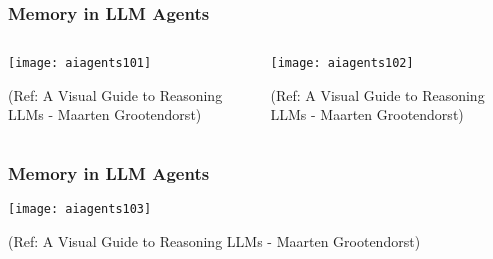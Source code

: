 \begin{frame}[fragile]\frametitle{Memory in LLM Agents}


\begin{columns}
    \begin{column}[T]{0.6\linewidth}
        \begin{center}
        \texttt{[image: aiagents101]}

		
        {\tiny (Ref: A Visual Guide to Reasoning LLMs - Maarten Grootendorst)}
        \end{center}

    \end{column}
    \begin{column}[T]{0.4\linewidth}
        \begin{center}
        \texttt{[image: aiagents102]}

		
        {\tiny (Ref: A Visual Guide to Reasoning LLMs - Maarten Grootendorst)}
        \end{center}
    \end{column}
  \end{columns}

\end{frame}

\begin{frame}[fragile]\frametitle{Memory in LLM Agents}

        \begin{center}
        \texttt{[image: aiagents103]}

		
        {\tiny (Ref: A Visual Guide to Reasoning LLMs - Maarten Grootendorst)}
        \end{center}


\end{frame}

